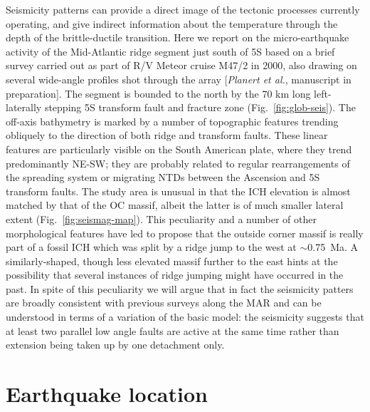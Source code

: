 \documentclass[jgr]{agu2001}
\newlength{\tw}
\begin{document}
\begin{article}
Seismicity patterns can provide a direct image of the tectonic
processes currently operating, and give indirect information about the
temperature through the depth of the brittle-ductile transition.
Here we report on the micro-earthquake activity of the Mid-Atlantic
ridge segment just south of 5\dg S based on a brief survey carried out
as part of R/V Meteor
cruise M47/2 in 2000, also drawing on several wide-angle profiles shot
through the array [{\it Planert et al.}, manuscript in preparation].
The segment is bounded to the north by the 70 km long left-laterally
stepping 5\dg S transform fault and fracture zone
(Fig.~\ref{fig:glob-seis}).  The off-axis bathymetry is marked by a
number of topographic features trending obliquely to the direction of
both ridge and transform faults. These linear features are particularly visible on the South
American plate, where they trend predominantly NE-SW; they are probably
related to regular rearrangements of the spreading system or migrating
NTDs between the Ascension and 5\dg S transform faults. 
 The study area is unusual in that the ICH elevation is almost matched
by that of the OC massif,
albeit the latter is of much smaller lateral extent
(Fig.~\ref{fig:seismag-map}).  This peculiarity and a number of other
morphological features have led \citet{reston02} to propose that the
outside corner massif is really part of a fossil ICH which was split
by a ridge jump to the west at $\sim$0.75~Ma.  A similarly-shaped,
though less elevated massif further to the east hints at the
possibility that several instances of ridge jumping might have
occurred in the past.   In spite of
this peculiarity we will argue that in fact the seismicity patters are
broadly consistent with previous surveys along the MAR and can be
understood in terms of a variation of the basic
\citet{tucholke94} model:  the seismicity suggests
that at least two parallel low angle faults are active at the same time
rather than extension being taken up by one detachment only.

\section{Earthquake location}


\end{article}
\end{document}
